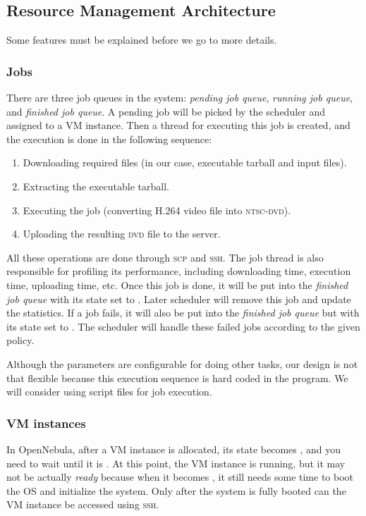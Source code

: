 \subsection{Resource Management Architecture}
Some features must be explained before we go to more details.

\subsubsection{Jobs}
There are three job queues in the system: \emph{pending job queue},
\emph{running job queue}, and \emph{finished job queue}. A pending job
will be picked by the scheduler and assigned to a VM instance. Then a
thread for executing this job is created, and the execution is done in
the following sequence:

\begin{enumerate}
\item Downloading required files (in our case, executable tarball and
  input files).
\item Extracting the executable tarball.
\item Executing the job (converting H.264 video file into
  \textsc{ntsc-dvd}).
\item Uploading the resulting \textsc{dvd} file to the server.
\end{enumerate}

All these operations are done through \textsc{scp} and \textsc{ssh}.
The job thread is also responsible for profiling its performance, including downloading time, execution time, uploading time, etc. Once this job is done, it will be put into the \emph{finished job queue} with its state set to
\statefinished. Later scheduler will remove this job and update the
statistics. If a job fails, it will also be put into the
\emph{finished job queue} but with its state set to \statefailed.
The scheduler will handle these failed jobs according to the given policy.

Although the parameters are configurable for doing other tasks, our
design is not that flexible because this execution sequence is hard
coded in the program. We will consider using script files for job
execution.


\subsubsection{VM instances}
In OpenNebula, after a VM instance is allocated, its state becomes
\statepending, and you need to wait until it is \staterunning.
At this point, the VM instance is running, but it may not be actually
\emph{ready} because when it becomes \staterunning, it still needs some
time to boot the OS and initialize the system. Only after the system is
fully booted can the VM instance be accessed using \textsc{ssh}.

